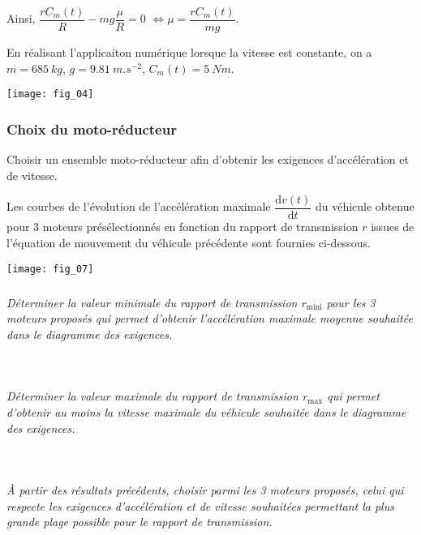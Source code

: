 \begin{multicols}{2}
\begin{corrige}
Ainsi, $\dfrac{rC_m(t)}{R}-mg\dfrac{\mu}{R}=0$ $ \Leftrightarrow \mu = \dfrac{rC_m(t)}{mg}$.

En réalisant l'applicaiton numérique lorsque la vitesse est constante, on a $m=\SI{685}{kg}$, $g=\SI{9,81}{m.s^{-2}}$, $C_m(t)=\SI{5}{Nm}$.
\end{corrige}
\else
\fi

\begin{center}
\texttt{[image: fig\_04]}
\end{center}


\subsubsection*{Choix du moto-réducteur}
\begin{obj}
Choisir un ensemble moto-réducteur afin d’obtenir les exigences d’accélération et de vitesse.
\end{obj}

Les courbes de l’évolution de l’accélération maximale $\dfrac{\text{d} v(t)}{\text{d} t}$
du véhicule obtenue pour 3 moteurs présélectionnés en fonction du rapport de transmission $r$ issues de l’équation de mouvement du véhicule précédente sont fournies ci-dessous.


\begin{center}
\texttt{[image: fig\_07]}
\end{center}


\subparagraph{}\textit{Déterminer la valeur minimale du rapport de transmission $r_{\text{mini}}$ pour les 3 moteurs proposés qui permet d’obtenir l’accélération maximale moyenne souhaitée dans le diagramme des exigences.}
\ifprof
\begin{corrige}~\\
\end{corrige}
\else
\fi


\subparagraph{}\textit{Déterminer la valeur maximale du rapport de transmission $r_{\text{max}}$ qui permet d’obtenir au moins la vitesse maximale du véhicule souhaitée dans le diagramme des exigences.}
\ifprof
\begin{corrige}~\\
\end{corrige}
\else
\fi


\subparagraph{}\textit{À partir des résultats précédents, choisir parmi les 3 moteurs proposés, celui qui respecte les exigences d’accélération et de vitesse souhaitées permettant la plus grande plage possible pour le rapport de transmission.}
\ifprof
\begin{corrige}~\\
\end{corrige}
\else
\fi



\end{multicols}
